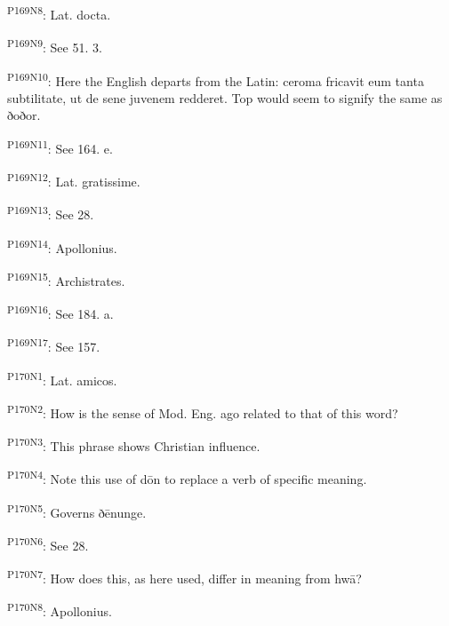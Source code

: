 \textsuperscript{P169N8}: Lat. docta.

\textsuperscript{P169N9}: See 51. 3.

\textsuperscript{P169N10}: Here the English departs from the Latin: ceroma fricavit eum tanta subtilitate, ut de sene juvenem redderet. Top would seem to signify the same as ðoðor.

\textsuperscript{P169N11}: See 164. e.

\textsuperscript{P169N12}: Lat. gratissime.

\textsuperscript{P169N13}: See 28.

\textsuperscript{P169N14}: Apollonius.

\textsuperscript{P169N15}: Archistrates.

\textsuperscript{P169N16}: See 184. a.

\textsuperscript{P169N17}: See 157.

\textsuperscript{P170N1}: Lat. amicos.

\textsuperscript{P170N2}: How is the sense of Mod. Eng. ago related to that of this word?

\textsuperscript{P170N3}: This phrase shows Christian influence.

\textsuperscript{P170N4}: Note this use of dōn to replace a verb of specific meaning.

\textsuperscript{P170N5}: Governs ðēnunge.

\textsuperscript{P170N6}: See 28.

\textsuperscript{P170N7}: How does this, as here used, differ in meaning from hwā?

\textsuperscript{P170N8}: Apollonius.

